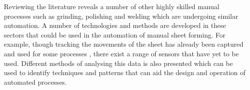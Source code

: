 Reviewing the literature reveals a number of other highly skilled manual processes such as grinding, polishing and welding which are undergoing similar automation. A number of technologies and methods are developed in these sectors that could be used in the automation of manual sheet forming. For example, though tracking the movements of the sheet has already been captured and used for some processes \citep{Opritescu2012AutomatedStrategy}, there exist a range of sensors that have yet to be used. Different methods of analysing this data is also presented which can be used to identify techniques and patterns that can aid the design and operation of automated processes.





 

 




